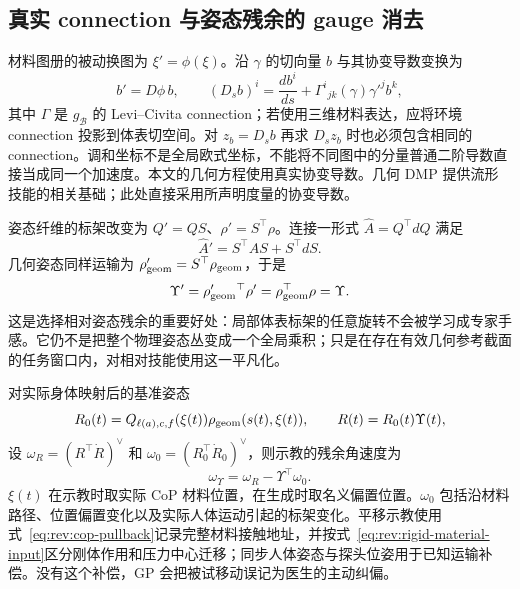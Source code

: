 \documentclass[11pt,a4paper]{article}
\numberwithin{equation}{section}
\theoremstyle{definition}
\begin{document}
\subsection{真实 connection 与姿态残余的 gauge 消去}
材料图册的被动换图为 $\xi'=\phi(\xi)$。沿 $\gamma$ 的切向量 $b$ 与其协变导数变换为
\begin{equation}
 b'=D\phi\,b,\qquad
 (D_sb)^i=\frac{db^i}{ds}
 +\Gamma^i{}_{jk}(\gamma)\gamma'^j b^k,
 \label{eq:v43-coordinate-connection}
\end{equation}
其中 $\Gamma$ 是 $g_{\mathcal B}$ 的 Levi--Civita connection；若使用三维材料表达，应将环境 connection 投影到体表切空间。对 $z_b=D_sb$ 再求 $D_sz_b$ 时也必须包含相同的 connection。调和坐标不是全局欧式坐标，不能将不同图中的分量普通二阶导数直接当成同一个加速度。本文的几何方程使用真实协变导数。几何 DMP 提供流形技能的相关基础\cite{gdmp2024}；此处直接采用所声明度量的协变导数。

姿态纤维的标架改变为 $Q'=QS$、$\rho'=S^\top\rho$。连接一形式 $\widehat A=Q^\top dQ$ 满足
\begin{equation}
 \widehat A'=S^\top\widehat A S+S^\top dS.
 \label{eq:v43-gauge-connection}
\end{equation}
几何姿态同样运输为 $\rho_{\rm geom}'=S^\top\rho_{\rm geom}$，于是
\begin{equation}
 \Upsilon'=\rho_{\rm geom}'{}^\top\rho'
 =\rho_{\rm geom}^\top\rho=\Upsilon.
 \label{eq:v43-invariant-residual}
\end{equation}
这是选择相对姿态残余的重要好处：局部体表标架的任意旋转不会被学习成专家手感。它仍不是把整个物理姿态丛变成一个全局乘积；只是在存在有效几何参考截面的任务窗口内，对相对技能使用这一平凡化。

对实际身体映射后的基准姿态
\begin{equation}
 R_0(t)=Q_{\ell(a),c,f}(\xi(t))\rho_{\rm geom}(s(t),\xi(t)),\qquad
 R(t)=R_0(t)\Upsilon(t),
\end{equation}
设 $\omega_R=(R^\top\dot R)^\vee$ 和 $\omega_0=(R_0^\top\dot R_0)^\vee$，则示教的残余角速度为
\begin{equation}
 \omega_\Upsilon=\omega_R-\Upsilon^\top\omega_0.
 \label{eq:v43-human-angle-compensation}
\end{equation}
$\xi(t)$ 在示教时取实际 CoP 材料位置，在生成时取名义偏置位置。$\omega_0$ 包括沿材料路径、位置偏置变化以及实际人体运动引起的标架变化。平移示教使用式~\eqref{eq:rev:cop-pullback}记录完整材料接触地址，并按式~\eqref{eq:rev:rigid-material-input}区分刚体作用和压力中心迁移；同步人体姿态与探头位姿用于已知运输补偿。没有这个补偿，GP 会把被试移动误记为医生的主动纠偏。
\end{document}
